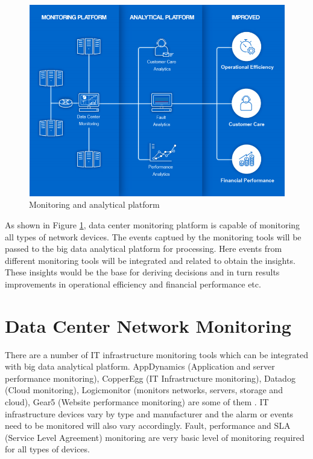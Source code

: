 \documentclass[sigconf]{acmart}
\begin{document}
\begin{figure}[htb]
  \centering
  \includegraphics[width=1.0\columnwidth]{images/Figure1.png}
  \caption{Monitoring and analytical platform 
  \cite{datacenter-monitoring-and-analytics-platform}}
  \label{fig:Figure1} 
\end{figure}

As shown in Figure \ref{fig:Figure1}, data center monitoring platform is capable of monitoring all types of network devices. The events captued by the monitoring tools will be passed to the big data analytical platform for processing. Here events from different monitoring tools will be integrated and related to obtain the insights. These insights would be the base for deriving decisions and in turn results improvements in operational efficiency and financial performance etc.

\section{Data Center Network Monitoring}

There are a number of IT infrastructure monitoring tools which can be integrated with big data analytical platform. AppDynamics (Application and server performance monitoring), CopperEgg (IT Infrastructure monitoring), Datadog (Cloud monitoring), Logicmonitor (monitors networks, servers, storage and cloud), Gear5 (Website performance monitoring) are some of them \cite{top-server-monitoring-application-performance-monitoring-apm-solutions}. IT infrastructure devices vary by type and manufacturer and the alarm or events need to be monitored will also vary accordingly. Fault, performance and SLA (Service Level Agreement) monitoring are very basic level of monitoring required for all types of devices.
\end{document}
